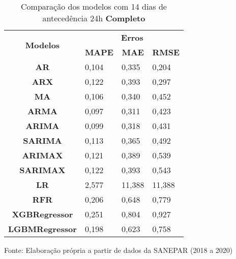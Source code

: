 \begin{table}[H]
	\centering
	\caption{Comparação dos modelos com 14 dias de antecedência 24h \textbf{Completo} }\label{tb:30-24cm}
	\begin{tabular}{@{}clll@{}}
		\toprule
		\multirow{2}{*}{\textbf{Modelos}} & \multicolumn{3}{c}{\textbf{Erros}}                                                                       \\ \cmidrule(l){2-4} 
		& \multicolumn{1}{c}{\textbf{MAPE}} & \multicolumn{1}{c}{\textbf{MAE}} & \multicolumn{1}{c}{\textbf{RMSE}} \\ \hline
\textbf{AR}                       & 0,104                             & 0,335                            & 0,204                             \\
\textbf{ARX}                      & 0,122                             & 0,393                            & 0,297                             \\
\textbf{MA}                       & 0,106                             & 0,340                            & 0,452                             \\
\textbf{ARMA}                     & 0,097                             & 0,311                            & 0,423                             \\
\textbf{ARIMA}                    & 0,099                             & 0,318                            & 0,431                             \\
\textbf{SARIMA}                   & 0,113                             & 0,365                            & 0,492                             \\
\textbf{ARIMAX}                   & 0,121                             & 0,389                            & 0,539                             \\
\textbf{SARIMAX}                  & 0,122                             & 0,393                            & 0,543                             \\
\textbf{LR}                       & 2,577                             & 11,388                           & 11,388                            \\
\textbf{RFR}                      & 0,206                             & 0,648                            & 0,779                             \\
\textbf{XGBRegressor}             & 0,251                             & 0,804                            & 0,927                             \\
\textbf{LGBMRegressor}            & 0,198                             & 0,623                            & 0,758                             \\ \bottomrule
	\end{tabular}

Fonte: Elaboração própria a partir de dados da SANEPAR (2018 a 2020)
\end{table}


